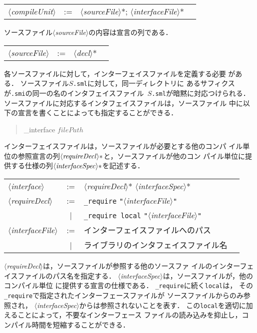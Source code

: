 \documentclass{jbook}
\newcommand{\vbar}{\mbox{\ $|$\ }}
\newcommand{\nonterm}[1]{\mbox{$\langle$}{\it #1}\mbox{$\rangle$}}
\newcommand{\term}[1]{\mbox{{\tt #1}}}
\newenvironment{program}{\begin{quote}\begin{tt}}%
                        {\end{tt}\end{quote}}
\begin{document}
\begin{center}
\begin{tabular}{lcll}
\nonterm{compileUnit} &:=& \nonterm{sourceFile}*; \nonterm{interfaceFile}*
\end{tabular}
\end{center}

	ソースファイル\nonterm{sourceFile}の内容は宣言の列である．

\begin{center}
\begin{tabular}{lcll}
\nonterm{sourceFile} &:=& \nonterm{decl}*
\end{tabular}
\end{center}

	各ソースファイルに対して，インターフェイスファイルを定義する必要
がある．
	ソースファイル\mbox{\tt $S$.sml}に対して，同一ディレクトリに
あるサフィクスが{\tt .smi}の同一の名のインタフェイスファイル\mbox{\tt
$S$.sml}が暗黙に対応つけられる．
	ソースファイルに対応するインタフェイスファイルは，ソースファイル
中に以下の宣言を書くことによっても指定することができる．
\begin{program}
\_interface $filePath$
\end{program}

	インターフェイスファイルは，ソースファイルが必要とする他のコンパ
イル単位の参照宣言の列$\nonterm{requireDecl}*$と，ソースファイルが他のコン
パイル単位に提供する仕様の列$\nonterm{interfaceSpec}*$を記述する．

\begin{center}
\begin{tabular}{lcll}
\nonterm{interface} &:=& \nonterm{requireDecl}* \nonterm{interfaceSpec}*
\\
\nonterm{requireDecl} &:=& \term{\_require} \term{"}\nonterm{interfaceFile}\term{"}\\

&\vbar& \term{\_require local} \term{"}\nonterm{interfaceFile}\term{"}
\\
\nonterm{interfaceFile} &:=& インターフェイスファイルへのパス\\
                        &\vbar& ライブラリのインタフェイスファイル名
\end{tabular}
\end{center}

	\nonterm{requireDecl}は，ソースファイルが参照する他のソースファ
イルのインターフェイスファイルのパス名を指定する．
	\nonterm{interfaceSpec}は，ソースファイルが，他のコンパイル単位
に提供する宣言の仕様である．
	\term{\_require}に続く\term{local}は，
その\term{\_require}で指定されたインターフェースファイルが
ソースファイルからのみ参照され，
\nonterm{interfaceSpec}からは参照されないことを表す．
	この\term{local}を適切に加えることによって，不要なインターフェース
ファイルの読み込みを抑止し，コンパイル時間を短縮することができる．
\end{document}
